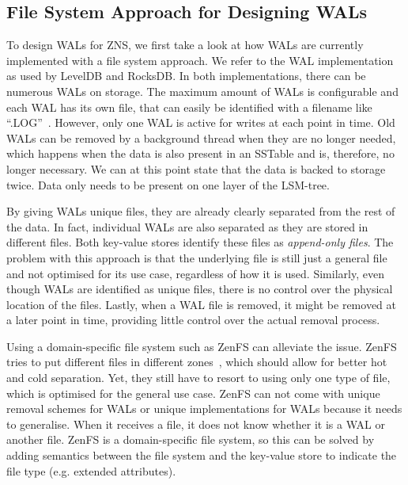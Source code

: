 \subsection{File System Approach for Designing WALs}
To design WALs for ZNS, we first take a look at how WALs are currently implemented with a file system approach. We refer to the WAL implementation as used by LevelDB and RocksDB. In both implementations, there can be numerous WALs on storage. The maximum amount of WALs is configurable and each WAL has its own file, that can easily be identified with a filename like ``.LOG''~\cite{RocksDB}. However, only one WAL is active for writes at each point in time. Old WALs can be removed by a background thread when they are no longer needed, which happens when the data is also present in an SSTable and is, therefore, no longer necessary. We can at this point state that the data is backed to storage twice. Data only needs to be present on one layer of the LSM-tree.

By giving WALs unique files, they are already clearly separated from the rest of the data. In fact, individual WALs are also separated as they are stored in different files. Both key-value stores identify these files as \textit{append-only files}. The problem with this approach is that the underlying file is still just a general file and not optimised for its use case, regardless of how it is used. Similarly, even though WALs are identified as unique files, there is no control over the physical location of the files. Lastly, when a WAL file is removed, it might be removed at a later point in time, providing little control over the actual removal process.

Using a domain-specific file system such as ZenFS can alleviate the issue. ZenFS tries to put different files in different zones~\cite{bjorling2021zns}, which should allow for better hot and cold separation. Yet, they still have to resort to using only one type of file, which is optimised for the general use case. ZenFS can not come with unique removal schemes for WALs or unique implementations for WALs because it needs to generalise. When it receives a file, it does not know whether it is a WAL or another file. ZenFS is a domain-specific file system, so this can be solved by adding semantics between the file system and the key-value store to indicate the file type (e.g. extended attributes).

